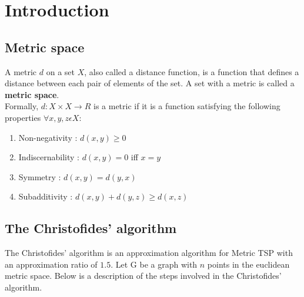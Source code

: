 \chapter{Introduction}

\section{Metric space}

A metric $d$ on a set $X$, also called a distance function, is a function
that defines a distance between each pair of elements of the set. A
set with a metric is called a \textbf{metric space}.\\

Formally, $d : X \times X \rightarrow R$ is a metric if it is a function satisfying the following properties $\forall x, y, z \epsilon X$:
\begin{enumerate}
\item{Non-negativity : $d(x, y) \geq 0$}
\item{Indiscernability : $d(x, y) = 0$ iff $x = y$}
\item{Symmetry : $d(x, y) = d(y, x)$}
\item{Subadditivity : $d(x, y) + d(y, z) \geq d(x, z)$}
\end{enumerate}
\section{The Christofides' algorithm}
The Christofides' algorithm is an approximation algorithm for Metric TSP with an approximation ratio of $1.5$. Let G be a graph with $n$ points in the euclidean metric space. Below is a description of the steps involved in the Christofides' algorithm.
\vspace{0.7in}
